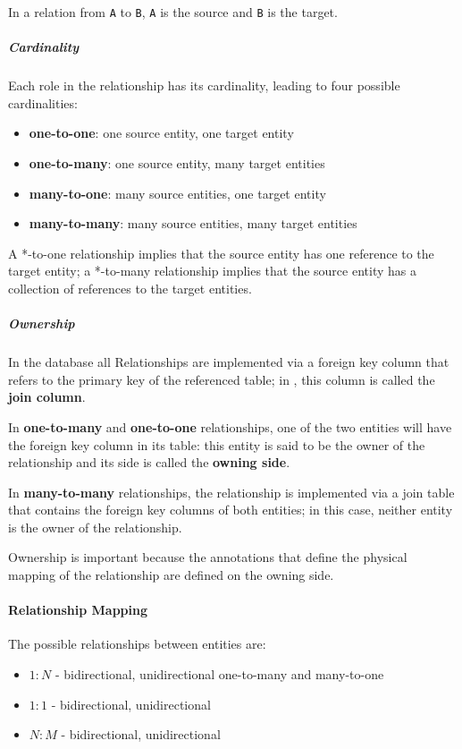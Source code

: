 \documentclass[english]{article}
\begin{document}
In a relation from \texttt{A} to \texttt{B}, \texttt{A} is the source and \texttt{B} is the target.

\subparagraph*{Cardinality}
Each role in the relationship has its cardinality, leading to four possible cardinalities:

\begin{itemize}
  \item \textbf{one-to-one}: one source entity, one target entity
  \item \textbf{one-to-many}: one source entity, many target entities
  \item \textbf{many-to-one}: many source entities, one target entity
  \item \textbf{many-to-many}: many source entities, many target entities
\end{itemize}

A *-to-one relationship implies that the source entity has one reference to the target entity;
a *-to-many relationship implies that the source entity has a collection of references to the target entities.

\subparagraph*{Ownership}
In the database all Relationships are implemented via a foreign key column that refers to the primary key of the referenced table;
in \jpa, this column is called the \textbf{join column}.

In \textbf{one-to-many} and \textbf{one-to-one} relationships, one of the two entities will have the foreign key column in its table:
this entity is said to be the owner of the relationship and its side is called the \textbf{owning side}.

In \textbf{many-to-many} relationships, the relationship is implemented via a join table that contains the foreign key columns of both entities;
in this case, neither entity is the owner of the relationship.

Ownership is important because the annotations that define the physical mapping of the relationship are defined on the owning side.

\paragraph{Relationship Mapping}

The possible relationships between entities are:

\begin{itemize}
  \item \(1:N\) - bidirectional, unidirectional one-to-many and many-to-one
  \item \(1:1\) - bidirectional, unidirectional
  \item \(N:M\) - bidirectional, unidirectional
\end{itemize}
\end{document}

